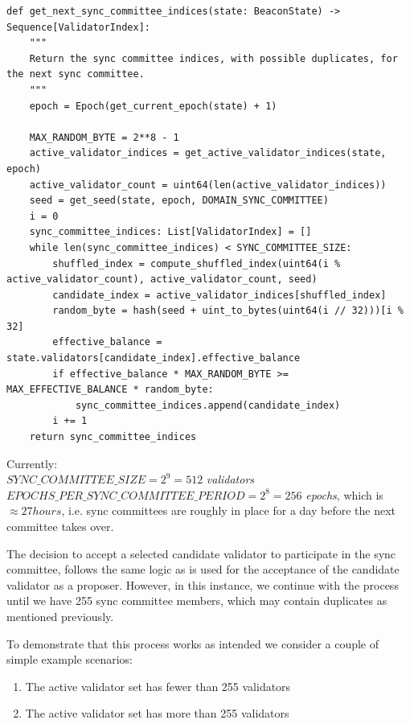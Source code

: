 \lstset{language=Python}

\begin{lstlisting}
def get_next_sync_committee_indices(state: BeaconState) -> Sequence[ValidatorIndex]:
    """
    Return the sync committee indices, with possible duplicates, for the next sync committee.
    """
    epoch = Epoch(get_current_epoch(state) + 1)

    MAX_RANDOM_BYTE = 2**8 - 1
    active_validator_indices = get_active_validator_indices(state, epoch)
    active_validator_count = uint64(len(active_validator_indices))
    seed = get_seed(state, epoch, DOMAIN_SYNC_COMMITTEE)
    i = 0
    sync_committee_indices: List[ValidatorIndex] = []
    while len(sync_committee_indices) < SYNC_COMMITTEE_SIZE:
        shuffled_index = compute_shuffled_index(uint64(i % active_validator_count), active_validator_count, seed)
        candidate_index = active_validator_indices[shuffled_index]
        random_byte = hash(seed + uint_to_bytes(uint64(i // 32)))[i % 32]
        effective_balance = state.validators[candidate_index].effective_balance
        if effective_balance * MAX_RANDOM_BYTE >= MAX_EFFECTIVE_BALANCE * random_byte:
            sync_committee_indices.append(candidate_index)
        i += 1
    return sync_committee_indices
  \end{lstlisting}  
  
  \noindent 
 Currently: \\
 \noindent   
$SYNC\_COMMITTEE\_SIZE = 2^9 = 512$ \textit{ validators}\\
$EPOCHS\_PER\_SYNC\_COMMITTEE\_PERIOD = 2^8 = 256$ \textit{ epochs}, which is $\approx 27 hours$, i.e. sync committees are roughly in place for a day before the next committee takes over.
 
The decision to accept a selected candidate validator  to participate in the sync committee, follows the same logic as is used for the acceptance of the candidate validator as a proposer. However, in this instance, we continue with the process until we have 255 sync committee members, which may contain duplicates as mentioned previously.
 
To demonstrate that this process works as intended we consider a couple of simple example scenarios:
\begin{enumerate}
\item The active validator set has fewer than 255 validators
\item The active validator set has more than 255 validators
\end{enumerate}

